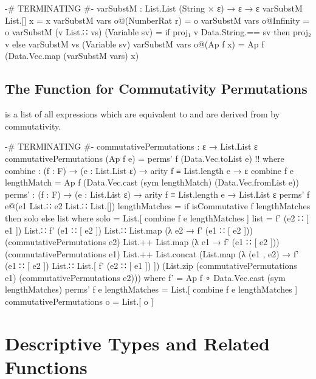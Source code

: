 \documentclass{report}
\begin{document}
\begin{code}
  {-# TERMINATING #-}
  varSubstM : List.List (String × ε) → ε → ε
  varSubstM List.[] x = x
  varSubstM vars o@(NumberRat r) = o
  varSubstM vars o@Infinity = o
  varSubstM (v List.∷ vs) (Variable sv) =
    if proj₁ v Data.String.== sv
       then proj₂ v
       else varSubstM vs (Variable sv)
  varSubstM vars o@(Ap f x) = Ap f (Data.Vec.map (varSubstM vars) x)
\end{code}

\section{The Function for Commutativity Permutations}
  is a list of all expressions which are equivalent to  and are derived from  by commutativity.

\begin{code}
  {-# TERMINATING #-}
  commutativePermutations : ε → List.List ε
  commutativePermutations (Ap f e) = perms' f (Data.Vec.toList e) {!!}
    where
    combine : (f : F) → (e : List.List ε) → arity f ≡ List.length e → ε
    combine f e lengthMatch = Ap f (Data.Vec.cast (sym lengthMatch)
                                                  (Data.Vec.fromList e))
    perms' : (f : F) → (e : List.List ε) → arity f ≡ List.length e → List.List ε
    perms' f e@(e1 List.∷ e2 List.∷ List.[]) lengthMatches =
      if isCommutative f lengthMatches then solo else list
      where
      solo = List.[ combine f e lengthMatches ]
      list =
        f' (e2 ∷ [ e1 ]) List.∷ f' (e1 ∷ [ e2 ]) List.∷
        List.map (λ e2 → f' (e1 ∷ [ e2 ])) (commutativePermutations e2) List.++
        List.map (λ e1 → f' (e1 ∷ [ e2 ])) (commutativePermutations e1) List.++
        List.concat (List.map (λ (e1 , e2) → f' (e1 ∷ [ e2 ]) List.∷
                                              List.[ f' (e2 ∷ [ e1 ]) ])
                              (List.zip (commutativePermutations e1)
                                        (commutativePermutations e2)))
        where f' = Ap f ∘ Data.Vec.cast (sym lengthMatches)
    perms' f e lengthMatches = List.[ combine f e lengthMatches ]
  commutativePermutations o = List.[ o ]
\end{code}

\chapter{Descriptive Types and Related Functions}
\end{document}
